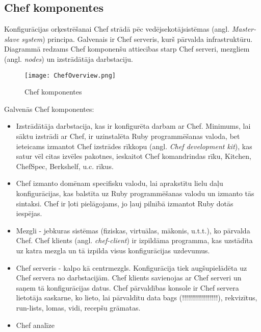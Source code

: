 \subsection{Chef komponentes}
Konfigurācijas orķestrēšanai Chef strādā pēc vedējsekotājsistēmas (angl. \textit{Master-slave system}) principa. Galvenais ir Chef serveris, kurš pārvalda infrastruktūru.
Diagrammā redzams Chef komponenšu attiecības starp Chef serveri, mezgliem (angl. \textit{nodes}) un izstrādātāja darbstaciju.
\begin{figure}[H]%
	\centering
	\captionsetup{justification=centering}
	\texttt{[image: ChefOverview.png]}
	\caption{Chef komponentes}
	\label{fig:ChefOverview}
\end{figure}
Galvenās Chef komponentes:
\begin{itemize}
	\item Izstrādātāja darbstacija, kas ir konfigurēta darbam ar Chef. Minimums, lai sāktu izstrādi ar Chef, ir uzinstalēta Ruby programmēšanas valoda, bet ieteicams izmantot Chef izstrādes rīkkopu (angl. \textit{Chef development kit}), kas satur vēl citas izvēles pakotnes, ieskaitot Chef komandrindas rīku, Kitchen, ChefSpec, Berkshelf, u.c. rīkus.
	\item Chef izmanto domēnam specifisku valodu, lai aprakstītu lielu daļu konfigurācijas, kas balstīta uz Ruby programmēšanas valodu un izmanto tās sintaksi. Chef ir ļoti pielāgojams, jo ļauj pilnībā izmantot Ruby dotās iespējas.
	\item Mezgli - jebkuras sistēmas (fiziskas, virtuālas, mākonis, u.t.t.), ko pārvalda Chef. Chef klients (angl. \textit{chef-client}) ir izpildāma programma, kas uzstādīta uz katra mezgla un tā izpilda visus konfigurācijas uzdevumus.
	\item Chef serveris - kalpo kā centrmezgls. Konfigurācija tiek augšupielādēta uz Chef servera no darbstacijām. Chef klients savienojas ar Chef serveri un saņem tā konfigurācijas datus.
	Chef pārvaldības konsole ir Chef servera lietotāja saskarne, ko lieto, lai pārvaldītu data bags (!!!!!!!!!!!!!!!!!!), rekvizītus, run-lists, lomas, vidi, recepšu grāmatas.
	\item Chef analīze
\end{itemize}



